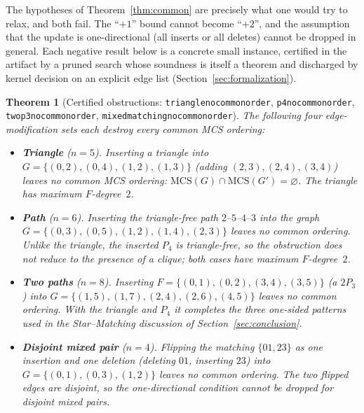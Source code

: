 \documentclass[11pt]{article}
\newtheorem{theorem}{Theorem}
\theoremstyle{definition}
\theoremstyle{remark}
\newcommand{\leanname}[1]{%
  \texttt{\begingroup\def\_{\textunderscore\allowbreak}#1\endgroup}}
\newcommand{\mcso}{\mathrm{MCS}}
\begin{document}
The hypotheses of Theorem~\ref{thm:common} are precisely what one would try to
relax, and both fail. The ``$+1$'' bound cannot become ``$+2$'', and the
assumption that the update is one-directional (all inserts or all deletes) cannot
be dropped in general. Each negative result below is a concrete small instance,
certified in the artifact by a pruned search whose soundness is itself a theorem
and discharged by kernel decision on an explicit edge list
(Section~\ref{sec:formalization}).

\begin{theorem}[Certified obstructions: \leanname{triangle\_no\_common\_order}, \leanname{p4\_no\_common\_order}, \leanname{two\_p3\_no\_common\_order}, \leanname{mixed\_matching\_no\_common\_order}]
\label{thm:obstructions}
The following four edge-modification sets each destroy every common MCS ordering:

\begin{itemize}
\setlength\itemsep{2pt}
\item \textbf{Triangle} ($n=5$). Inserting a triangle into
$G=\{(0,2),(0,4),(1,2),(1,3)\}$ (adding $(2,3),(2,4),(3,4)$) leaves no common MCS
ordering: $\mcso(G)\cap\mcso(G')=\varnothing$. The triangle has maximum
$F$-degree~$2$.

\item \textbf{Path} ($n=6$). Inserting the triangle-free path
$2\text{--}5\text{--}4\text{--}3$ into the graph
$G=\{(0,3),\allowbreak(0,5),\allowbreak(1,2),\allowbreak(1,4),\allowbreak(2,3)\}$
leaves no common ordering. Unlike the triangle, the inserted $P_4$ is
triangle-free, so the obstruction does not reduce to the presence of a clique;
both cases have maximum $F$-degree~$2$.

\item \textbf{Two paths} ($n=8$). Inserting
$F=\{(0,1),\allowbreak(0,2),\allowbreak(3,4),\allowbreak(3,5)\}$ (a $2P_3$) into
$G=\{(1,5),\allowbreak(1,7),\allowbreak(2,4),\allowbreak(2,6),\allowbreak(4,5)\}$
leaves no common ordering.
With the triangle and $P_4$ it completes the three one-sided patterns used in
the Star--Matching discussion of Section~\ref{sec:conclusion}.

\item \textbf{Disjoint mixed pair} ($n=4$). Flipping the matching $\{01,23\}$ as
one insertion and one deletion (deleting $01$, inserting $23$) into
$G=\{(0,1),(0,3),(1,2)\}$ leaves no common ordering. The two flipped edges are
\emph{disjoint}, so the one-directional condition cannot be dropped for disjoint
mixed pairs.
\end{itemize}
\end{theorem}
\end{document}
